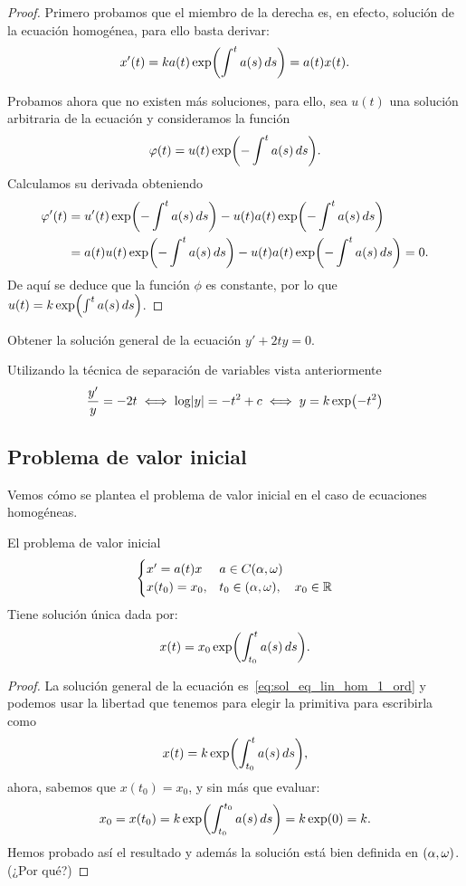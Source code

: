 \documentclass[../ecuaciones_diferenciales.tex]{subfiles}
\begin{document}
\begin{proof}
	Primero probamos que el miembro de la derecha es, en efecto,
	solución de la ecuación homogénea, para ello basta derivar:
	\[x'(t) = k a(t) \expf{\int^t a(s) \dif s} = a(t) x(t).\]

	Probamos ahora que no existen más soluciones, para ello, sea \(u(t)\) una
	solución arbitraria de la ecuación y consideramos la función
	\[\phi(t) = u(t) \expf{-\int^t a(s) \dif s}.\]
	Calculamos su derivada obteniendo
	\begin{align*}
		\phi'(t) & = u'(t) \expf{-\int^t a(s) \dif s}
		- u(t) a(t) \expf{-\int^t a(s) \dif s}            \\
		         & = a(t) u(t) \expf{-\int^t a(s) \dif s}
		- u(t) a(t) \expf{-\int^t a(s) \dif s} = 0.
	\end{align*}
	De aquí se deduce que la función \(\phi\) es constante, por lo que
	\(u(t) = k \expf{\int^t a(s) \dif s}\).
\end{proof}

\begin{example}
	Obtener la solución general de la ecuación \(y' + 2ty = 0\).
\end{example}

\begin{solution}
	Utilizando la técnica de separación de variables vista anteriormente
	\[\frac{y'}{y} = -2t \iff \log\abs{y} = -t^2 + c \iff y = k \expf{-t^2}\]
\end{solution}

\subsection{Problema de valor inicial}\label{sec:pvi}

Vemos cómo se plantea el problema de valor inicial en el caso de ecuaciones
homogéneas.

\begin{theorem}
	El problema de valor inicial
	\[
		\eqsys{
			x' = a(t) x & a \in C\openopen{\alpha}{\omega}  \\
			x(t_0) = x_0, & t_0 \in \openopen{\alpha}{\omega}, \quad x_0 \in \R
		}
	\]
	Tiene solución única dada por:
	\[x(t) = x_0 \expf{\int_{t_0}^t a(s) \dif s}.\]
\end{theorem}

\begin{proof}
	La solución general de la ecuación es~\eqref{eq:sol_eq_lin_hom_1_ord} y podemos usar la libertad que
	tenemos para elegir la primitiva para escribirla como
	\[x(t) = k \expf{\int_{t_0}^t a(s) \dif s},\]
	ahora, sabemos que \(x(t_0) = x_0\), y sin más que evaluar:
	\[x_0 = x(t_0) = k \expf{\int_{t_0}^{t_0} a(s) \dif s} = k\expf0 = k.\]
	Hemos probado así el resultado y además la solución está bien definida en
	\(\openopen{\alpha}{\omega}\). (¿Por qué?)
\end{proof}
\end{document}
